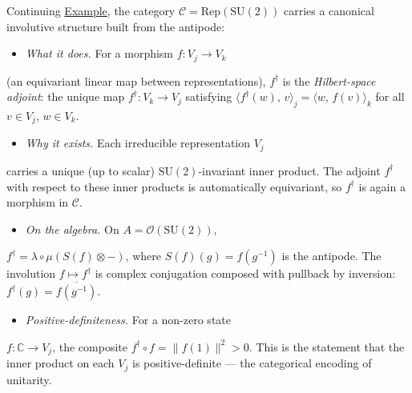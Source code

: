 \begin{example}
  \label{ex:dagger-su2}
Continuing \hyperref[ex:frobenius-su2]{Example}, the category
$\mathcal{C} = \mathrm{Rep}(\mathrm{SU}(2))$ carries a canonical
involutive structure built from the antipode:

\begin{itemize}
  \item \emph{What it does.} For a morphism $f \colon V_j \to V_k$
\end{itemize}
  (an equivariant linear map between representations),
  $f^{\dagger}$ is the \emph{Hilbert-space adjoint}: the unique
  map $f^{\dagger} \colon V_k \to V_j$ satisfying
  $\langle f^{\dagger}(w),\, v \rangle_j
  = \langle w,\, f(v) \rangle_k$
  for all $v \in V_j$, $w \in V_k$.
\begin{itemize}
  \item \emph{Why it exists.} Each irreducible representation $V_j$
\end{itemize}
  carries a unique (up to scalar) $\mathrm{SU}(2)$-invariant
  inner product. The adjoint $f^{\dagger}$ with respect to
  these inner products is automatically equivariant, so
  $f^{\dagger}$ is again a morphism in $\mathcal{C}$.
\begin{itemize}
  \item \emph{On the algebra.} On $A = \mathcal{O}(\mathrm{SU}(2))$,
\end{itemize}
  $f^{\dagger} = \lambda \circ \mu(S(f) \otimes -)$, where
  $S(f)(g) = f(g^{-1})$ is the antipode. The involution
  $f \mapsto f^{\dagger}$ is complex conjugation composed with
  pullback by inversion: $f^{\dagger}(g) = \overline{f(g^{-1})}$.
\begin{itemize}
  \item \emph{Positive-definiteness.} For a non-zero state
\end{itemize}
  $f \colon \mathbb{C} \to V_j$, the composite
  $f^{\dagger} \circ f = \lVert f(1) \rVert^2 > 0$.
  This is the statement that the inner product on each $V_j$ is
  positive-definite --- the categorical encoding of unitarity.
\end{example}

